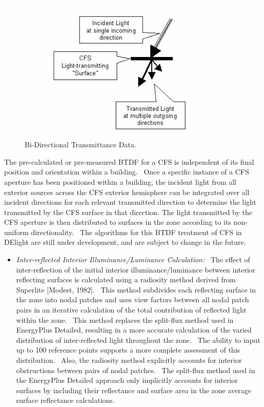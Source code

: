 \begin{figure}[hbtp] %
\centering
\includegraphics[width=0.9\textwidth, height=0.9\textheight, keepaspectratio=true]{media/image827.png}
\caption{  Bi-Directional Transmittance Data. \protect \label{fig:bi-directional-transmittance-data.}}
\end{figure}

The pre-calculated or pre-measured BTDF for a CFS is independent of its final position and orientation within a building.~ Once a specific instance of a CFS aperture has been positioned within a building, the incident light from all exterior sources across the CFS exterior hemisphere can be integrated over all incident directions for each relevant transmitted direction to determine the light transmitted by the CFS surface in that direction. The light transmitted by the CFS aperture is then distributed to surfaces in the zone according to its non-uniform directionality.~ The algorithms for this BTDF treatment of CFS in DElight are still under development, and are subject to change in the future.

\begin{itemize}
\tightlist
\item
  \emph{Inter-reflected Interior Illuminance/Luminance Calculation:}~ The effect of inter-reflection of the initial interior illuminance/luminance between interior reflecting surfaces is calculated using a radiosity method derived from Superlite {[}Modest, 1982{]}.~ This method subdivides each reflecting surface in the zone into nodal patches and uses view factors between all nodal patch pairs in an iterative calculation of the total contribution of reflected light within the zone.~ This method replaces the split-flux method used in EnergyPlus Detailed, resulting in a more accurate calculation of the varied distribution of inter-reflected light throughout the zone.~ The ability to input up to 100 reference points supports a more complete assessment of this distribution.~ Also, the radiosity method explicitly accounts for interior obstructions between pairs of nodal patches.~ The split-flux method used in the EnergyPlus Detailed approach only implicitly accounts for interior surfaces by including their reflectance and surface area in the zone average surface reflectance calculations.
\end{itemize}

